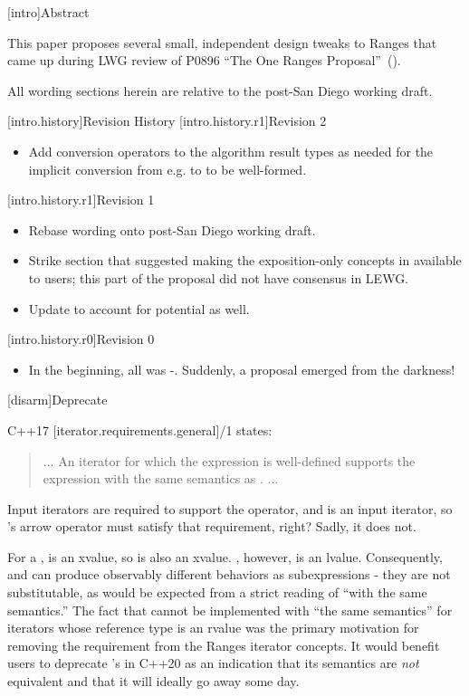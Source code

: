 [intro]{Abstract}

This paper proposes several small, independent design tweaks to Ranges that came
up during LWG review of P0896 ``The One Ranges Proposal''~(\cite{P0896}).

All wording sections herein are relative to the post-San Diego working draft.

[intro.history]{Revision History}
[intro.history.r1]{Revision 2}
\begin{itemize}
\item Add conversion operators to the algorithm result types as needed for the
  implicit conversion from e.g.  to
   to be well-formed.
\end{itemize}
[intro.history.r1]{Revision 1}
\begin{itemize}
\item Rebase wording onto post-San Diego working draft.
\item Strike section that suggested making the exposition-only concepts
  in  available to users; this part of the proposal
  did not have consensus in LEWG.
\item Update  to account for potential 
  as well.
\end{itemize}
[intro.history.r0]{Revision 0}
\begin{itemize}
\item In the beginning, all was \cv-. Suddenly, a proposal emerged
  from the darkness!
\end{itemize}

[disarm]{Deprecate }

C++17 [iterator.requirements.general]/1 states:
\begin{quote}
... An iterator  for which the expression  is well-defined
supports the expression  with the same semantics as . ...
\end{quote}
Input iterators are required to support the \tcode{->}
operator,
and  is an input iterator,
so 's arrow operator must satisfy that requirement, right?
Sadly, it does not.

For a ,  is an xvalue, so  is also
an xvalue. , however, is an lvalue. Consequently,  and
 can produce observably different behaviors as subexpressions - they
are not substitutable, as would be expected from a strict reading of ``with the
same semantics.'' The fact that \tcode{->} cannot be implemented with ``the same
semantics'' for iterators whose reference type is an rvalue was the primary
motivation for removing the \tcode{->} requirement from the Ranges iterator
concepts. It would benefit users to deprecate 's
 in C++20 as an indication that its semantics are \textit{not}
equivalent and that it will ideally go away some day.


